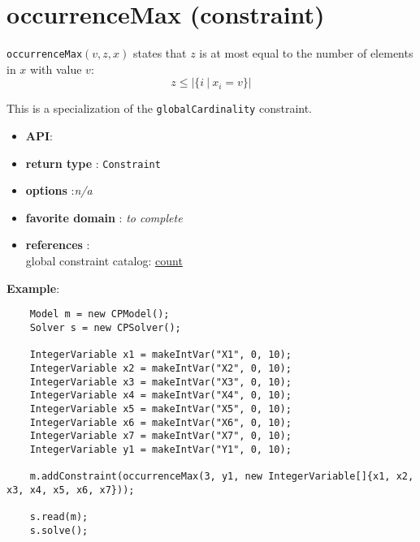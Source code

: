 \label{occurrencemax}
\hypertarget{occurrencemax}{}

\section{occurrenceMax (constraint)}\label{occurrencemax:occurrencemaxconstraint}\hypertarget{occurrencemax:occurrencemaxconstraint}{}
\begin{notedef}
  \texttt{occurrenceMax}$(v,z,x)$ states that $z$ is at most equal to the number of elements in $x$ with value $v$:
$$z\le|\{i\ |\ x_i=v\}|$$   
\end{notedef}
  This is a specialization of the \texttt{globalCardinality} constraint.

\begin{itemize}
	\item \textbf{API}: 
	\item \textbf{return type} : \texttt{Constraint}
	\item \textbf{options} :\emph{n/a}
	\item \textbf{favorite domain} : \emph{to complete}
	\item \textbf{references} :\\
      global constraint catalog: \href{http://www.emn.fr/x-info/sdemasse/gccat/Ccount.html}{count}
\end{itemize}

\textbf{Example}:
\begin{lstlisting}
	Model m = new CPModel();
	Solver s = new CPSolver();
	 
	IntegerVariable x1 = makeIntVar("X1", 0, 10);
	IntegerVariable x2 = makeIntVar("X2", 0, 10);
	IntegerVariable x3 = makeIntVar("X3", 0, 10);
	IntegerVariable x4 = makeIntVar("X4", 0, 10);
	IntegerVariable x5 = makeIntVar("X5", 0, 10);
	IntegerVariable x6 = makeIntVar("X6", 0, 10);
	IntegerVariable x7 = makeIntVar("X7", 0, 10);
	IntegerVariable y1 = makeIntVar("Y1", 0, 10);
	 
	m.addConstraint(occurrenceMax(3, y1, new IntegerVariable[]{x1, x2, x3, x4, x5, x6, x7}));
	 
	s.read(m);
	s.solve();
\end{lstlisting} 
